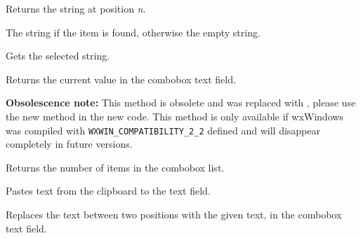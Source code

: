 \label{wxcomboboxgetstring}


Returns the string at position {\it n}.




The string if the item is found, otherwise the empty string.

\label{wxcomboboxgetstringselection}


Gets the selected string.

\label{wxcomboboxgetvalue}


Returns the current value in the combobox text field.

\label{wxcomboboxnumber}


{\bf Obsolescence note:} This method is obsolete and was replaced with 
, please use the new method in the new
code. This method is only available if wxWindows was compiled with 
{\tt WXWIN\_COMPATIBILITY\_2\_2} defined and will disappear completely in
future versions.

Returns the number of items in the combobox list.

\label{wxcomboboxpaste}


Pastes text from the clipboard to the text field.

\label{wxcomboboxreplace}


Replaces the text between two positions with the given text, in the combobox text field.




